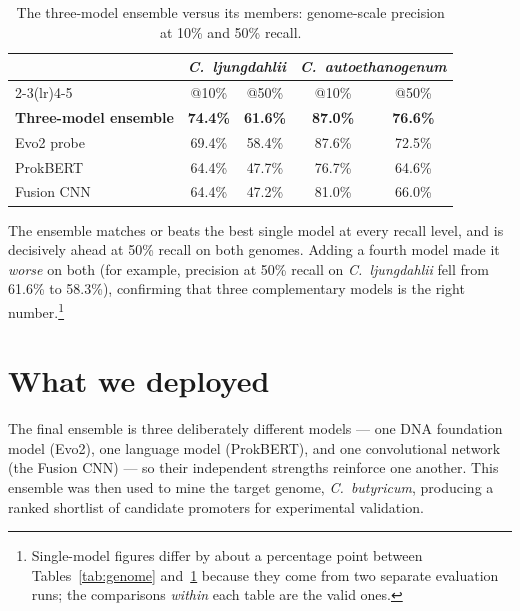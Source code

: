 \documentclass{article}
\begin{document}
\begin{table}[h]
\centering
\caption{The three-model ensemble versus its members: genome-scale precision at 10\% and 50\% recall.}
\label{tab:ensemble}
\begin{tabular}{lcccc}
\toprule
& \multicolumn{2}{c}{\emph{C.\ ljungdahlii}} & \multicolumn{2}{c}{\emph{C.\ autoethanogenum}} \\
\cmidrule(lr){2-3}\cmidrule(lr){4-5}
& @10\% & @50\% & @10\% & @50\% \\
\midrule
\textbf{Three-model ensemble} & \textbf{74.4\%} & \textbf{61.6\%} & \textbf{87.0\%} & \textbf{76.6\%} \\
Evo2 probe                    & 69.4\% & 58.4\% & 87.6\% & 72.5\% \\
ProkBERT                      & 64.4\% & 47.7\% & 76.7\% & 64.6\% \\
Fusion CNN                    & 64.4\% & 47.2\% & 81.0\% & 66.0\% \\
\bottomrule
\end{tabular}
\end{table}

The ensemble matches or beats the best single model at every recall level, and is decisively ahead at
50\% recall on both genomes. Adding a fourth model made it \emph{worse} on both (for example, precision at
50\% recall on \emph{C.\ ljungdahlii} fell from 61.6\% to 58.3\%), confirming that three complementary
models is the right number.\footnote{Single-model figures differ by about a percentage point between
Tables~\ref{tab:genome} and~\ref{tab:ensemble} because they come from two separate evaluation runs; the
comparisons \emph{within} each table are the valid ones.}

\section{What we deployed}
The final ensemble is three deliberately different models --- one DNA foundation model (Evo2), one
language model (ProkBERT), and one convolutional network (the Fusion CNN) --- so their independent
strengths reinforce one another. This ensemble was then used to mine the target genome, \emph{C.\
butyricum}, producing a ranked shortlist of candidate promoters for experimental validation.
\end{document}

